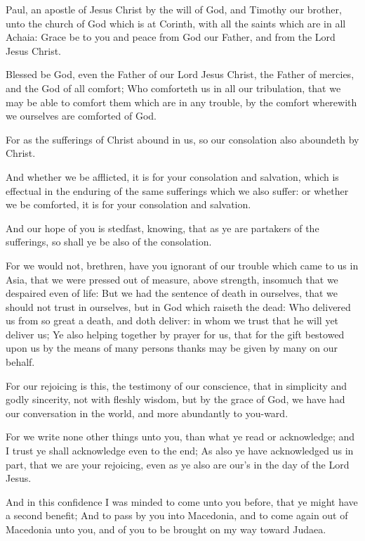 \Chapter
\Verse Paul, an apostle of Jesus Christ by the will of God, and Timothy our brother, unto the church of God which is at Corinth, with all the saints which are in all Achaia: \Verse Grace be to you and peace from God our Father, and from the Lord Jesus Christ.

\Verse Blessed be God, even the Father of our Lord Jesus Christ, the Father of mercies, and the God of all comfort; \Verse Who comforteth us in all our tribulation, that we may be able to comfort them which are in any trouble, by the comfort wherewith we ourselves are comforted of God.

\Verse For as the sufferings of Christ abound in us, so our consolation also aboundeth by Christ.

\Verse And whether we be afflicted, it is for your consolation and salvation, which is effectual in the enduring of the same sufferings which we also suffer: or whether we be comforted, it is for your consolation and salvation.

\Verse And our hope of you is stedfast, knowing, that as ye are partakers of the sufferings, so shall ye be also of the consolation.

\Verse For we would not, brethren, have you ignorant of our trouble which came to us in Asia, that we were pressed out of measure, above strength, insomuch that we despaired even of life: \Verse But we had the sentence of death in ourselves, that we should not trust in ourselves, but in God which raiseth the dead: \Verse Who delivered us from so great a death, and doth deliver: in whom we trust that he will yet deliver us; \Verse Ye also helping together by prayer for us, that for the gift bestowed upon us by the means of many persons thanks may be given by many on our behalf.

\Verse For our rejoicing is this, the testimony of our conscience, that in simplicity and godly sincerity, not with fleshly wisdom, but by the grace of God, we have had our conversation in the world, and more abundantly to you-ward.

\Verse For we write none other things unto you, than what ye read or acknowledge; and I trust ye shall acknowledge even to the end; \Verse As also ye have acknowledged us in part, that we are your rejoicing, even as ye also are our's in the day of the Lord Jesus.

\Verse And in this confidence I was minded to come unto you before, that ye might have a second benefit; \Verse And to pass by you into Macedonia, and to come again out of Macedonia unto you, and of you to be brought on my way toward Judaea.

